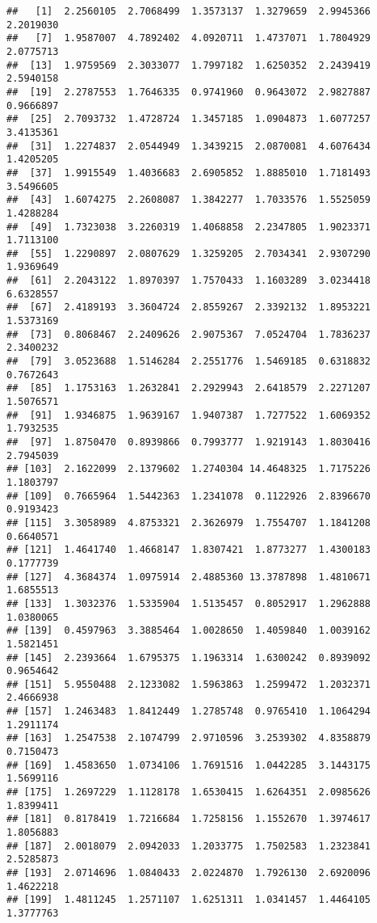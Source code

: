 \documentclass[
]{article}
\begin{document}
\begin{verbatim}
##   [1]  2.2560105  2.7068499  1.3573137  1.3279659  2.9945366  2.2019030
##   [7]  1.9587007  4.7892402  4.0920711  1.4737071  1.7804929  2.0775713
##  [13]  1.9759569  2.3033077  1.7997182  1.6250352  2.2439419  2.5940158
##  [19]  2.2787553  1.7646335  0.9741960  0.9643072  2.9827887  0.9666897
##  [25]  2.7093732  1.4728724  1.3457185  1.0904873  1.6077257  3.4135361
##  [31]  1.2274837  2.0544949  1.3439215  2.0870081  4.6076434  1.4205205
##  [37]  1.9915549  1.4036683  2.6905852  1.8885010  1.7181493  3.5496605
##  [43]  1.6074275  2.2608087  1.3842277  1.7033576  1.5525059  1.4288284
##  [49]  1.7323038  3.2260319  1.4068858  2.2347805  1.9023371  1.7113100
##  [55]  1.2290897  2.0807629  1.3259205  2.7034341  2.9307290  1.9369649
##  [61]  2.2043122  1.8970397  1.7570433  1.1603289  3.0234418  6.6328557
##  [67]  2.4189193  3.3604724  2.8559267  2.3392132  1.8953221  1.5373169
##  [73]  0.8068467  2.2409626  2.9075367  7.0524704  1.7836237  2.3400232
##  [79]  3.0523688  1.5146284  2.2551776  1.5469185  0.6318832  0.7672643
##  [85]  1.1753163  1.2632841  2.2929943  2.6418579  2.2271207  1.5076571
##  [91]  1.9346875  1.9639167  1.9407387  1.7277522  1.6069352  1.7932535
##  [97]  1.8750470  0.8939866  0.7993777  1.9219143  1.8030416  2.7945039
## [103]  2.1622099  2.1379602  1.2740304 14.4648325  1.7175226  1.1803797
## [109]  0.7665964  1.5442363  1.2341078  0.1122926  2.8396670  0.9193423
## [115]  3.3058989  4.8753321  2.3626979  1.7554707  1.1841208  0.6640571
## [121]  1.4641740  1.4668147  1.8307421  1.8773277  1.4300183  0.1777739
## [127]  4.3684374  1.0975914  2.4885360 13.3787898  1.4810671  1.6855513
## [133]  1.3032376  1.5335904  1.5135457  0.8052917  1.2962888  1.0380065
## [139]  0.4597963  3.3885464  1.0028650  1.4059840  1.0039162  1.5821451
## [145]  2.2393664  1.6795375  1.1963314  1.6300242  0.8939092  0.9654642
## [151]  5.9550488  2.1233082  1.5963863  1.2599472  1.2032371  2.4666938
## [157]  1.2463483  1.8412449  1.2785748  0.9765410  1.1064294  1.2911174
## [163]  1.2547538  2.1074799  2.9710596  3.2539302  4.8358879  0.7150473
## [169]  1.4583650  1.0734106  1.7691516  1.0442285  3.1443175  1.5699116
## [175]  1.2697229  1.1128178  1.6530415  1.6264351  2.0985626  1.8399411
## [181]  0.8178419  1.7216684  1.7258156  1.1552670  1.3974617  1.8056883
## [187]  2.0018079  2.0942033  1.2033775  1.7502583  1.2323841  2.5285873
## [193]  2.0714696  1.0840433  2.0224870  1.7926130  2.6920096  1.4622218
## [199]  1.4811245  1.2571107  1.6251311  1.0341457  1.4464105  1.3777763

\end{verbatim}
\end{document}
